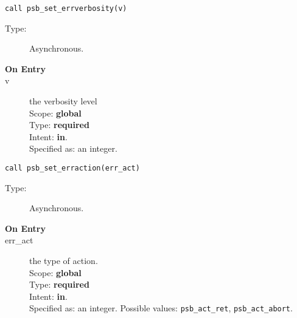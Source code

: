 \clearpage{}

\begin{lstlisting}
call psb_set_errverbosity(v)
\end{lstlisting}

\begin{description}
\item[Type:] Asynchronous.
\item[\bf On Entry]
\item[v] the verbosity level\\
Scope: {\bf global}\\
Type: {\bf required}\\
Intent: {\bf in}.\\
Specified as: an integer.
\end{description}

\clearpage{}


\begin{lstlisting}
call psb_set_erraction(err_act)
\end{lstlisting}

\begin{description}
\item[Type:] Asynchronous.
\item[\bf On Entry]
\item[err\_act] the type of action.\\
Scope: {\bf global} \\
Type: {\bf required}\\
Intent: {\bf in}.\\
Specified as: an integer. Possible values: \verb|psb_act_ret|,
\verb|psb_act_abort|. 
\end{description}






